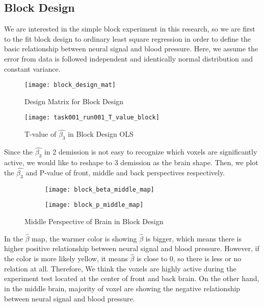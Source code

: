 \subsection{Block Design}

We are interested in the simple block experiment in this research, so we are 
first to the fit block design to ordinary least square regression in order to
define the basic relationship between neural signal and blood pressure. Here, 
we assume the error from data is followed independent and identically normal
distribution and constant variance.

\begin{figure}[!h]
\centering
\texttt{[image: block\_design\_mat]}
\caption{Design Matrix for Block Design}
\end{figure}

\begin{figure}[!h]
\centering
\texttt{[image: task001\_run001\_T\_value\_block]}
\caption{T-value of $\hat{\beta_{3}}$ in Block Design OLS}
\end{figure}

Since the $\hat{\beta_{3}}$ in 2 demission is not easy to recognize which voxels
are significantly active, we would like to reshape to 3 demission as the brain 
shape. Then, we plot the $\hat{\beta_{3}}$ and P-value of front, middle and 
back perspectives respectively.

\begin{figure}[!h]
\centering
\begin{subfigure}{.45\textwidth}
  \texttt{[image: block\_beta\_middle\_map]}
\end{subfigure}%
\begin{subfigure}{.5\textwidth}
  \texttt{[image: block\_p\_middle\_map]}
  \centering
\end{subfigure}
\caption{Middle Perspective of Brain in Block Design\label{fig:mpBrain}}
\end{figure}

In the $\hat{\beta}$ map, the warmer color is showing $\hat{\beta}$ is 
bigger, which means there is higher positive relationship between neural signal and
blood pressure. However, if the color is more likely yellow, it means 
$\hat{\beta}$ is close to 0, so there is less or no relation at all. 
Therefore, We think the voxels are highly active during the experiment test 
located at the center of front and back brain. On the other hand, in the middle
brain, majority of voxel are showing the negative relationship between neural
signal and blood pressure.

